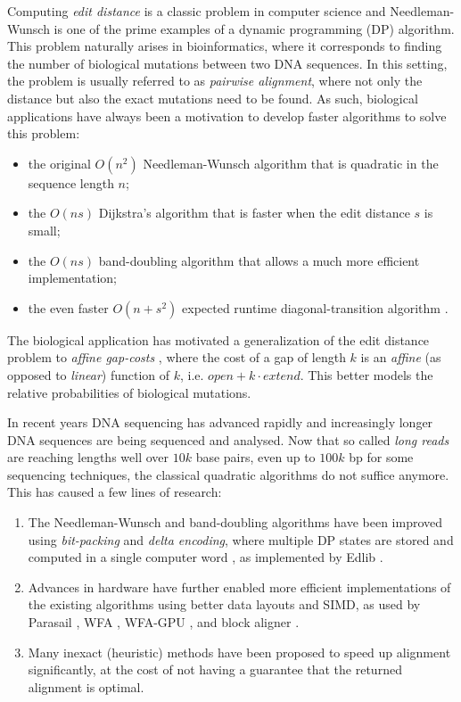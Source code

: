 \documentclass[11pt,english,a4paper]{article}
\begin{document}
Computing \emph{edit distance} is a classic problem in computer science and
Needleman-Wunsch \autocite{nw,sellers} is one of the
prime examples of a dynamic programming (DP) algorithm.
This problem naturally arises in bioinformatics, where it corresponds to finding
the number of biological mutations between two DNA sequences. In this setting,
the problem is usually referred to as \emph{pairwise alignment}, where not only the
distance but also the exact mutations need to be found. As such,
biological applications have always been a motivation to develop faster
algorithms to solve this problem:
\begin{itemize}
\item the original \(O(n^2)\) Needleman-Wunsch algorithm \autocite{nw,sellers} that is
quadratic in the sequence length \(n\);
\item the \(O(ns)\) Dijkstra's algorithm that is faster when the edit distance \(s\) is small;
\item the \(O(ns)\) band-doubling algorithm \autocite{ukkonen85} that allows a much more
efficient implementation;
\item the even faster \(O(n+s^2)\) expected runtime diagonal-transition algorithm \autocite{ukkonen85,myers86}.
\end{itemize}
The biological application has motivated a generalization of the edit distance
problem to \emph{affine gap-costs} \autocites{waterman}[][]{gotoh}[][]{wfa}, where the cost of
a gap of length \(k\) is an \emph{affine} (as opposed to \emph{linear}) function of \(k\),
i.e. \(open + k\cdot extend\).  This better models the relative probabilities of
biological mutations.

In recent years DNA sequencing has advanced rapidly and increasingly
longer DNA sequences are being sequenced and analysed. Now that so called
\emph{long reads} are reaching lengths well over \(10k\) base pairs, even up to \(100k\)
bp for some sequencing techniques, the classical quadratic algorithms do not
suffice anymore. This has caused a few lines of research:
\begin{enumerate}
\item The Needleman-Wunsch and band-doubling algorithms have been improved using
\emph{bit-packing} and \emph{delta encoding}, where multiple DP states are stored and
computed in a single computer word
\autocite{myers99,difference-recurrence-relations}, as implemented by Edlib \autocite{edlib}.
\item Advances in hardware have further enabled more efficient
implementations of the existing algorithms using better data layouts and
SIMD, as used by Parasail \autocite{parasail}, WFA \autocite{wfa}, WFA-GPU
\autocite{wfa-gpu}, and block aligner \autocite{block-aligner}.
\item Many inexact (heuristic) methods have been proposed to speed up alignment
significantly, at the cost of not having a guarantee that the returned
alignment is optimal.
\end{enumerate}
\end{document}
